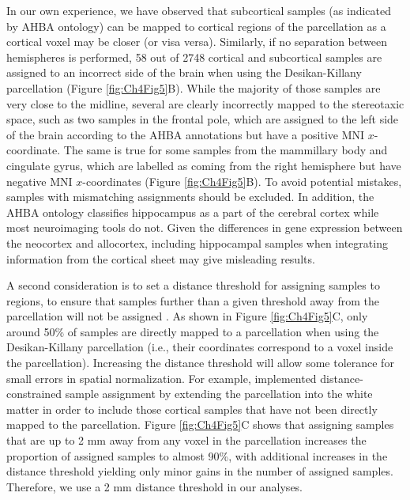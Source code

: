 In our own experience, we have observed that subcortical samples (as indicated by AHBA ontology) can be mapped to cortical regions of the parcellation as a cortical voxel may be closer (or visa versa). Similarly, if no separation between hemispheres is performed, 58 out of \num{2748} cortical and subcortical samples are assigned to an incorrect side of the brain when using the Desikan-Killany \citep{Desikan2006} parcellation (Figure \ref{fig:Ch4Fig5}B). While the majority of those samples are very close to the midline, several are clearly incorrectly mapped to the stereotaxic space, such as two samples in the frontal pole, which are assigned to the left side of the brain according to the AHBA annotations but have a positive MNI $x$-coordinate. The same is true for some samples from the mammillary body and cingulate gyrus, which are labelled as coming from the right hemisphere but have negative MNI $x$-coordinates (Figure \ref{fig:Ch4Fig5}B). To avoid potential mistakes, samples with mismatching assignments should be excluded. In addition, the AHBA ontology classifies hippocampus as a part of the cerebral cortex while most neuroimaging tools do not. Given the differences in gene expression between the neocortex and allocortex, including hippocampal samples when integrating information from the cortical sheet may give misleading results.

A second consideration is to set a distance threshold for assigning samples to regions, to ensure that samples further than a given threshold away from the parcellation will not be assigned \citep{Romero-Garcia2018}. As shown in Figure \ref{fig:Ch4Fig5}C, only around 50\% of samples are directly mapped to a parcellation when using the Desikan-Killany \citep{Desikan2006} parcellation (i.e., their coordinates correspond to a voxel inside the parcellation). Increasing the distance threshold will allow some tolerance for small errors in spatial normalization. For example, \citet{Romero-Garcia2018} implemented distance-constrained sample assignment by extending the parcellation into the white matter in order to include those cortical samples that have not been directly mapped to the parcellation. Figure \ref{fig:Ch4Fig5}C shows that assigning samples that are up to 2 mm away from any voxel in the parcellation increases the proportion of assigned samples to almost 90\%, with additional increases in the distance threshold yielding only minor gains in the number of assigned samples. Therefore, we use a 2 mm distance threshold in our analyses.

